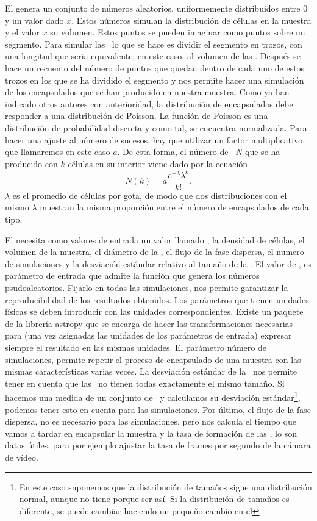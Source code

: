 El  genera un conjunto de números aleatorios, uniformemente distribuidos entre 0 y un valor dado $x$. Estos números simulan la distribución de células en la muestra y el valor $x$ su volumen. Estos puntos se pueden imaginar como puntos sobre un segmento. Para simular las \gotas\ lo que se hace es dividir el segmento en trozos, con una longitud que seria equivalente, en este caso, al volumen de las \gotas. Después se hace un recuento del número de puntos que quedan dentro de cada uno de estos trozos en los que se ha dividido el segmento y nos permite hacer una simulación de los encapsulados que se han producido en nuestra muestra. Como ya han indicado otros autores con anterioridad, la distribución de encapsulados debe responder a una distribución de Poisson. La función de Poisson es una distribución de probabilidad discreta y como tal, se encuentra normalizada. Para hacer una ajuste al número de sucesos, hay que utilizar un factor multiplicativo, que llamaremos en este caso $a$. De esta forma, el número de \gotas\ $N$ que se ha producido con $k$ células en su interior viene dado por la ecuación
\begin{equation}\label{eq:poisson}
    N(k)=a\frac{{e}^{-\lambda} {\lambda}^{k}}{k!}.
\end{equation}
$\lambda$ es el promedio de células por gota, de modo que dos distribuciones con el mismo $\lambda$ muestran la misma proporción entre el número de encapsulados de cada tipo.

El  necesita como valores de entrada un valor llamado , la densidad de células, el volumen de la muestra, el diámetro de la \gota, el flujo de la fase dispersa, el numero de simulaciones y la desviación estándar relativo al tamaño de la \gota. El valor de , es parámetro de entrada que admite la función que genera los números psudoaleatorios. Fijarlo en todas las simulaciones, nos permite garantizar la reproducibilidad de los resultados obtenidos. Los parámetros que tienen unidades físicas se deben introducir con las unidades correspondientes. Existe un paquete de la librería astropy que se encarga de hacer las transformaciones necesarias para (una vez asignadas las unidades de los parámetros de entrada) expresar siempre el resultado en las mismas unidades. El parámetro número de simulaciones, permite repetir el proceso de encapsulado de una muestra con las mismas características varias veces. La desviación estándar de la \gota\ nos permite tener en cuenta que las \gotas\ no tienen todas exactamente el mismo tamaño. Si hacemos una medida de un conjunto de \gotas\ y calculamos su desviación estándar\footnote{En este caso suponemos que la distribución de tamaños sigue una distribución normal, aunque no tiene porque ser así. Si la distribución de tamaños es diferente, se puede cambiar haciendo un pequeño cambio en el }, podemos tener esto en cuenta para las simulaciones. Por último, el flujo de la fase dispersa, no es necesario para las simulaciones, pero nos calcula el tiempo que vamos a tardar en encapsular la muestra y la tasa de formación de las \gotas, lo son datos útiles, para por ejemplo ajustar la tasa de frames por segundo de la cámara de vídeo.

